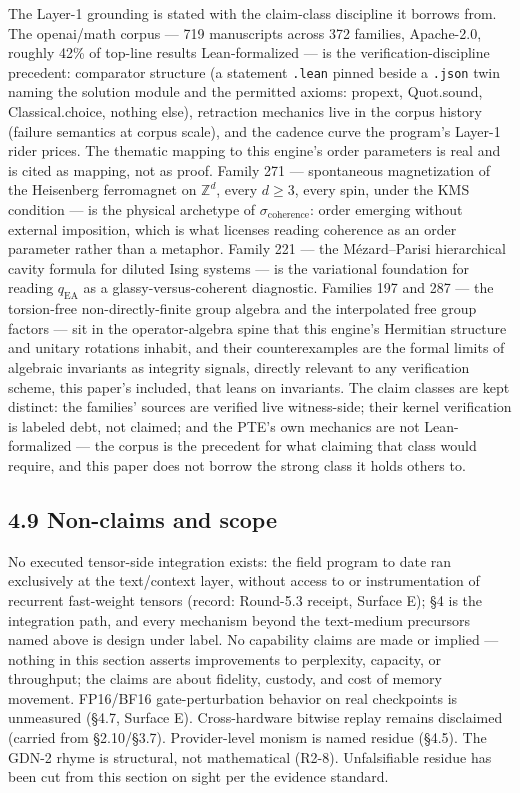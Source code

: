 \documentclass[11pt]{article}
\begin{document}
The Layer-1 grounding is stated with the claim-class discipline it borrows from. The openai/math corpus --- 719 manuscripts across 372 families, Apache-2.0, roughly 42\% of top-line results Lean-formalized --- is the verification-discipline precedent: comparator structure (a statement \texttt{.lean} pinned beside a \texttt{.json} twin naming the solution module and the permitted axioms: propext, Quot.sound, Classical.choice, nothing else), retraction mechanics live in the corpus history (failure semantics at corpus scale), and the cadence curve the program's Layer-1 rider prices. The thematic mapping to this engine's order parameters is real and is cited as mapping, not as proof. Family 271 --- spontaneous magnetization of the Heisenberg ferromagnet on \(\mathbb{Z}^d\), every \(d \geq 3\), every spin, under the KMS condition --- is the physical archetype of \(\sigma_{\text{coherence}}\): order emerging without external imposition, which is what licenses reading coherence as an order parameter rather than a metaphor. Family 221 --- the Mézard--Parisi hierarchical cavity formula for diluted Ising systems --- is the variational foundation for reading \(q_{\text{EA}}\) as a glassy-versus-coherent diagnostic. Families 197 and 287 --- the torsion-free non-directly-finite group algebra and the interpolated free group factors --- sit in the operator-algebra spine that this engine's Hermitian structure and unitary rotations inhabit, and their counterexamples are the formal limits of algebraic invariants as integrity signals, directly relevant to any verification scheme, this paper's included, that leans on invariants. The claim classes are kept distinct: the families' sources are verified live witness-side; their kernel verification is labeled debt, not claimed; and the PTE's own mechanics are not Lean-formalized --- the corpus is the precedent for what claiming that class would require, and this paper does not borrow the strong class it holds others to.

\subsection{4.9 Non-claims and scope}\label{non-claims-and-scope-2}

No executed tensor-side integration exists: the field program to date ran exclusively at the text/context layer, without access to or instrumentation of recurrent fast-weight tensors (record: Round-5.3 receipt, Surface E); \S{}4 is the integration path, and every mechanism beyond the text-medium precursors named above is design under label. No capability claims are made or implied --- nothing in this section asserts improvements to perplexity, capacity, or throughput; the claims are about fidelity, custody, and cost of memory movement. FP16/BF16 gate-perturbation behavior on real checkpoints is unmeasured (\S{}4.7, Surface E). Cross-hardware bitwise replay remains disclaimed (carried from \S{}2.10/\S{}3.7). Provider-level monism is named residue (\S{}4.5). The GDN-2 rhyme is structural, not mathematical (R2-8). Unfalsifiable residue has been cut from this section on sight per the evidence standard.
\end{document}
